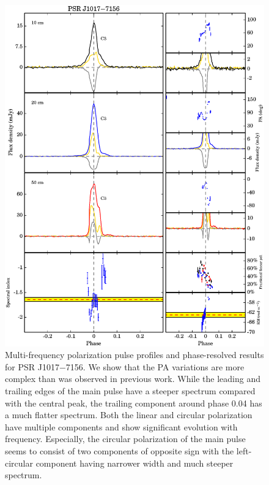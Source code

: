 \documentclass[useAMS,usenatbib]{mn2e}
\begin{document}
\begin{appendix}
\begin{figure}
\begin{center}
\includegraphics[width=6 in]{1017.ps}
\caption{Multi-frequency polarization pulse profiles and phase-resolved results for PSR J1017$-$7156. 
We show that the PA variations are more complex than was observed in 
previous work.
%
While the leading and trailing edges of the main pulse have a steeper spectrum 
compared with the central peak, the trailing component around phase 0.04 has
a much flatter spectrum.
%
Both the linear and circular polarization have multiple components and show 
significant evolution with frequency. Especially, the circular polarization of 
the main pulse seems to consist of two components of opposite sign with 
the left-circular component having narrower width and much steeper spectrum.
}
\label{1017}
\end{center}
\end{figure}


\end{appendix}
\end{document}
